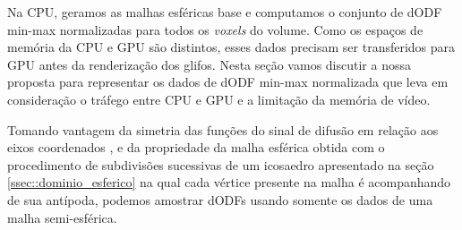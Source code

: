 
Na CPU, geramos as malhas esféricas base e computamos o conjunto de dODF min-max normalizadas para todos os \textit{voxels} do volume. Como os espaços de memória da CPU e GPU são distintos, esses dados precisam ser transferidos para GPU antes da renderização dos glifos. Nesta seção vamos discutir a nossa proposta para representar os dados de dODF min-max normalizada que leva em consideração o tráfego entre CPU e GPU e a limitação da memória de vídeo.



Tomando vantagem da simetria das funções do sinal de difusão em relação aos eixos coordenados \cite{descoteaux2015}, e da propriedade da malha esférica obtida com o procedimento de subdivisões sucessivas de um icosaedro apresentado na seção \ref{ssec::dominio_esferico} na qual cada vértice presente na malha é acompanhando de sua antípoda, podemos amostrar dODFs usando somente os dados de uma malha semi-esférica.

